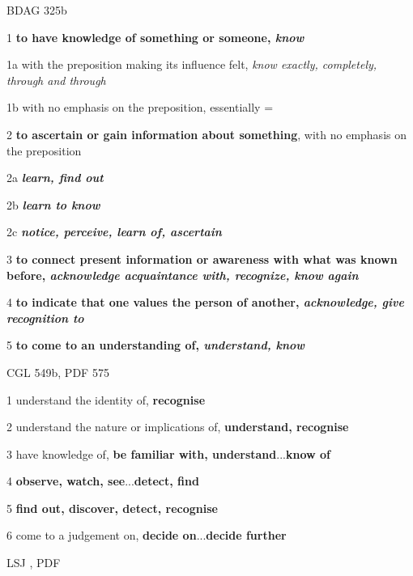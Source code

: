 				\begin{compactdesc}
					\item[BDAG 325b] \textbf{}
						\begin{compactitem}
							\item[1] \textbf{to have knowledge of something or someone, \textit{know}}
							\item[1a] with the preposition making its influence felt, \textit{know exactly, completely, through and through}
							\item[1b] with no emphasis on the preposition, essentially = 
							\item[2] \textbf{to ascertain or gain information about something}, with no emphasis on the preposition
							\item[2a] \textbf{\textit{learn, find out}}
							\item[2b] \textbf{\textit{learn to know}}
							\item[2c] \textbf{\textit{notice, perceive, learn of, ascertain}}
							\item[3] \textbf{to connect present information or awareness with what was known before, \textit{acknowledge acquaintance with, recognize, know again}}
							\item[4] \textbf{to indicate that one values the person of another, \textit{acknowledge, give recognition to}}
							\item[5] \textbf{to come to an understanding of, \textit{understand, know}}
						\end{compactitem}
					\item[CGL 549b, PDF 575] \textbf{}
						\begin{compactitem}
							\item[1] understand the identity of, \textbf{recognise}
							\item[2] understand the nature or implications of, \textbf{understand, recognise}
							\item[3] have knowledge of, \textbf{be familiar with, understand}...\textbf{know of}
							\item[4] \textbf{observe, watch, see}...\textbf{detect, find}
							\item[5] \textbf{find out, discover, detect, recognise}
							\item[6] come to a judgement on, \textbf{decide on}...\textbf{decide further}
						\end{compactitem}
					\item[LSJ , PDF ] \textbf{}
						\begin{compactitem}
							\item 
						\end{compactitem}
				\end{compactdesc}
				
